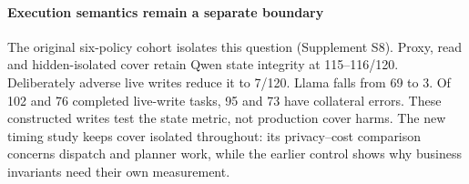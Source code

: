 \paragraph{Execution semantics remain a separate boundary}
The original six-policy cohort isolates this question (Supplement S8). Proxy, read and hidden-isolated cover retain Qwen state integrity at 115--116/120. Deliberately adverse live writes reduce it to 7/120. Llama falls from 69 to 3. Of 102 and 76 completed live-write tasks, 95 and 73 have collateral errors. These constructed writes test the state metric, not production cover harms. The new timing study keeps cover isolated throughout: its privacy--cost comparison concerns dispatch and planner work, while the earlier control shows why business invariants need their own measurement.
